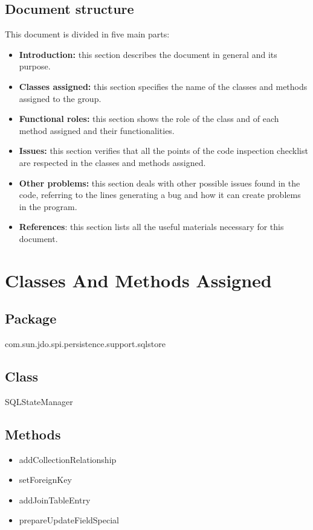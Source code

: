 \documentclass[18pt,oneside,a4paper, titlepage]{article}
\begin{document}
	\subsection{Document structure}
		This document is divided in five main parts:
		\begin{itemize}
			\item \textbf{Introduction:} this section describes the document in general and its purpose.
			\item  \textbf{Classes assigned:} this section specifies the name of the classes and methods assigned to the group.
			\item  \textbf{Functional roles:} this section shows the role of the class and of each method assigned and their functionalities.
			\item  \textbf{Issues:} this section verifies that all the points of the code inspection checklist are respected in the classes and methods assigned.
			\item  \textbf{Other problems:} this section deals with other possible issues found in the code, referring to the lines generating a bug and how it can create problems in the program.
			\item \textbf{References}: this section lists all the useful materials necessary for this document.
		\end{itemize}

\newpage	
\section{Classes And Methods Assigned}
	\subsection{Package}
		com.sun.jdo.spi.persistence.support.sqlstore
	\subsection{Class}
		SQLStateManager
	\subsection{Methods}
		\begin{itemize}
			\item addCollectionRelationship
			\item setForeignKey
			\item addJoinTableEntry
			\item prepareUpdateFieldSpecial
		\end{itemize}
		
\end{document}
